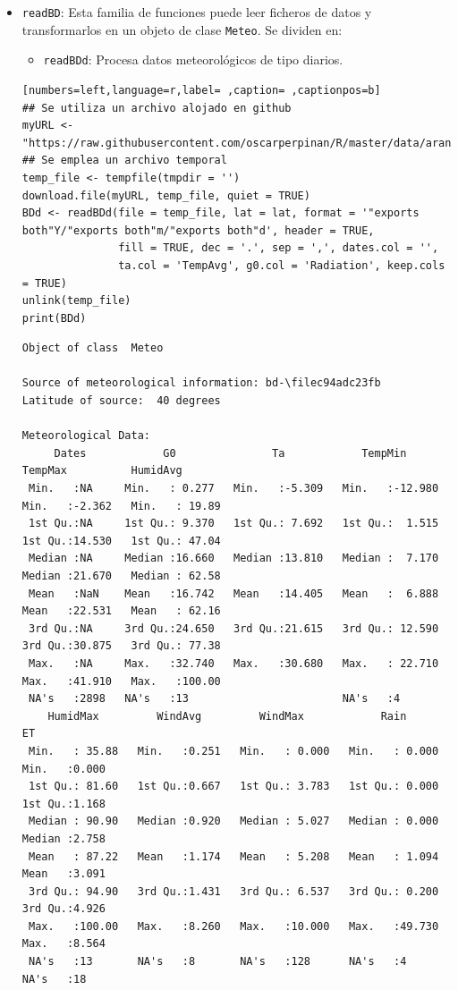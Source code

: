 \begin{itemize}
\item \texttt{readBD}: Esta familia de funciones puede leer ficheros de datos y transformarlos en un objeto de clase \texttt{Meteo}. Se dividen en:
\begin{itemize}
\item \texttt{readBDd}: Procesa datos meteorológicos de tipo diarios.
\end{itemize}
\begin{lstlisting}[numbers=left,language=r,label= ,caption= ,captionpos=b]
## Se utiliza un archivo alojado en github
myURL <-"https://raw.githubusercontent.com/oscarperpinan/R/master/data/aranjuez.csv"
## Se emplea un archivo temporal
temp_file <- tempfile(tmpdir = '') 
download.file(myURL, temp_file, quiet = TRUE)
BDd <- readBDd(file = temp_file, lat = lat, format = '"exports both"Y/"exports both"m/"exports both"d', header = TRUE,
               fill = TRUE, dec = '.', sep = ',', dates.col = '',
               ta.col = 'TempAvg', g0.col = 'Radiation', keep.cols = TRUE)
unlink(temp_file)
print(BDd)
\end{lstlisting}

\begin{verbatim}
Object of class  Meteo 

Source of meteorological information: bd-\filec94adc23fb 
Latitude of source:  40 degrees

Meteorological Data:
     Dates            G0               Ta            TempMin           TempMax          HumidAvg     
 Min.   :NA     Min.   : 0.277   Min.   :-5.309   Min.   :-12.980   Min.   :-2.362   Min.   : 19.89  
 1st Qu.:NA     1st Qu.: 9.370   1st Qu.: 7.692   1st Qu.:  1.515   1st Qu.:14.530   1st Qu.: 47.04  
 Median :NA     Median :16.660   Median :13.810   Median :  7.170   Median :21.670   Median : 62.58  
 Mean   :NaN    Mean   :16.742   Mean   :14.405   Mean   :  6.888   Mean   :22.531   Mean   : 62.16  
 3rd Qu.:NA     3rd Qu.:24.650   3rd Qu.:21.615   3rd Qu.: 12.590   3rd Qu.:30.875   3rd Qu.: 77.38  
 Max.   :NA     Max.   :32.740   Max.   :30.680   Max.   : 22.710   Max.   :41.910   Max.   :100.00  
 NA's   :2898   NA's   :13                        NA's   :4                                          
    HumidMax         WindAvg         WindMax            Rain              ET       
 Min.   : 35.88   Min.   :0.251   Min.   : 0.000   Min.   : 0.000   Min.   :0.000  
 1st Qu.: 81.60   1st Qu.:0.667   1st Qu.: 3.783   1st Qu.: 0.000   1st Qu.:1.168  
 Median : 90.90   Median :0.920   Median : 5.027   Median : 0.000   Median :2.758  
 Mean   : 87.22   Mean   :1.174   Mean   : 5.208   Mean   : 1.094   Mean   :3.091  
 3rd Qu.: 94.90   3rd Qu.:1.431   3rd Qu.: 6.537   3rd Qu.: 0.200   3rd Qu.:4.926  
 Max.   :100.00   Max.   :8.260   Max.   :10.000   Max.   :49.730   Max.   :8.564  
 NA's   :13       NA's   :8       NA's   :128      NA's   :4        NA's   :18
\end{verbatim}


\end{itemize}
